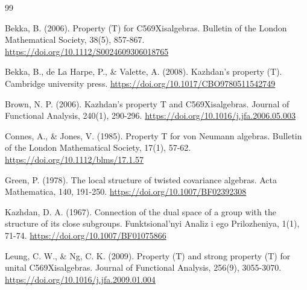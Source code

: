\documentclass[12pt, reqno]{amsart}
\theoremstyle{definition}
\theoremstyle{remark}
\numberwithin{equation}{section}
\begin{document}

\begin{thebibliography}{99}

 Bekka, B. (2006). Property (T) for C569Xisalgebras. Bulletin of the London Mathematical Society, 38(5), 857-867.
\url{https://doi.org/10.1112/S0024609306018765}

  Bekka, B., de La Harpe, P., \& Valette, A. (2008). Kazhdan's property (T). Cambridge university press.
\url{https://doi.org/10.1017/CBO9780511542749}

 Brown, N. P. (2006). Kazhdan's property T and C569Xisalgebras. Journal of Functional Analysis, 240(1), 290-296.
\url{https://doi.org/10.1016/j.jfa.2006.05.003}


  Connes, A., \& Jones, V. (1985). Property T for von Neumann algebras. Bulletin of the London Mathematical Society, 17(1), 57-62.
\url{https://doi.org/10.1112/blms/17.1.57}

  Green, P. (1978). The local structure of twisted covariance algebras. Acta Mathematica, 140, 191-250.
\url{https://doi.org/10.1007/BF02392308}
    
 Kazhdan, D. A. (1967). Connection of the dual space of a group with the structure of its close subgroups. Funktsional'nyi Analiz i ego Prilozheniya, 1(1), 71-74.
\url{https://doi.org/10.1007/BF01075866}

 Leung, C. W., \& Ng, C. K. (2009). Property (T) and strong property (T) for unital C569Xisalgebras. Journal of Functional Analysis, 256(9), 3055-3070.
\url{https://doi.org/10.1016/j.jfa.2009.01.004}

\end{thebibliography}
\end{document}
